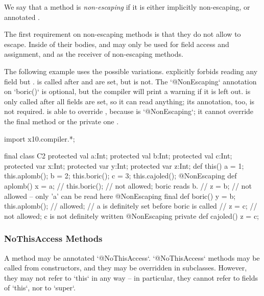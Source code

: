We say that a method is {\em non-escaping} if it is either implicitly
non-escaping, or annotated .

The first requirement on non-escaping methods is that they do not allow
 to escape. Inside of their bodies,  and  may
only be used for field access and assignment, and as the receiver of
non-escaping methods.


The following example uses the possible variations.   
explicitly forbids reading any field but
.  is called after  and  are set, but
 is not.
The \xcd`@NonEscaping` annotation on \xcd`boric()` is optional, but the
compiler will print a warning if it is left out.
 is only called after all fields are set, so it
can read anything; its annotation, too, is not required.    is able to override , because
 is \xcd`@NonEscaping`; it cannot override the final method
 or the private one .  
\begin{xten}
import x10.compiler.*;

final class C2 {
  protected val a:Int; protected val b:Int; protected val c:Int;
  protected var x:Int; protected var y:Int; protected var z:Int;
  def this() {
    a = 1;
    this.aplomb();
    b = 2;
    this.boric();
    c = 3;
    this.cajoled();
  }
  @NonEscaping def aplomb() {
    x = a;
    // this.boric(); // not allowed; boric reads b.
    // z = b; // not allowed -- only 'a' can be read here
  }
  @NonEscaping final def boric() {
    y = b;
    this.aplomb(); // allowed; 
       // a is definitely set before boric is called
    // z = c; // not allowed; c is not definitely written
  }
  @NonEscaping private def cajoled() {
    z = c;
  }
}

\end{xten}
%

\subsubsection{NoThisAccess Methods}

A method may be annotated \xcd`@NoThisAccess`.  \xcd`@NoThisAccess` methods
may be called from constructors, and they may be overridden in subclasses.
However, they may not refer to \xcd`this` in any way -- in particular, they
cannot refer to fields of \xcd`this`, nor to \xcd`super`.


